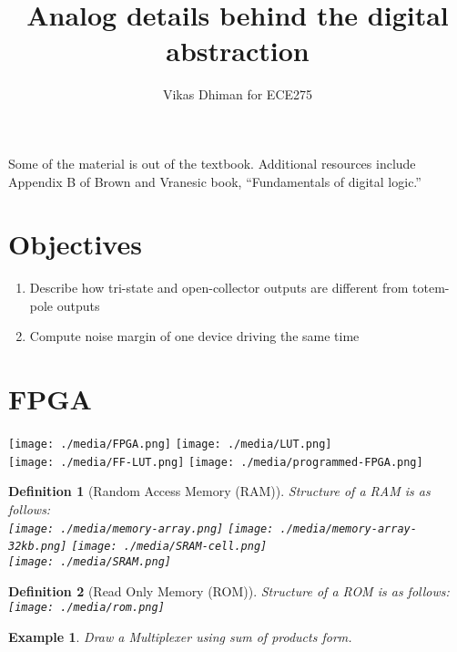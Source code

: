 \documentclass{article}
\author{Vikas Dhiman for ECE275}
\title{Analog details behind the digital abstraction}
\newtheorem{example}{Example}
\newtheorem{definition}{Definition}
\begin{document}
\maketitle

Some of the material is out of the textbook. Additional resources include
Appendix B of Brown and Vranesic book, ``Fundamentals of digital logic.''

\section{Objectives}
\begin{enumerate}
\item Describe how tri-state and open-collector outputs are different from totem-pole outputs
\item Compute noise margin of one device driving the same time
\end{enumerate}

\section{FPGA~\cite[Section~B.6.5]{stephen2022fundamentals}}
\texttt{[image: ./media/FPGA.png]}
\texttt{[image: ./media/LUT.png]}\\

\texttt{[image: ./media/FF-LUT.png]}
\texttt{[image: ./media/programmed-FPGA.png]}


\begin{definition}[Random Access Memory (RAM)] Structure of a RAM is as follows:\\
  \texttt{[image: ./media/memory-array.png]}
  \texttt{[image: ./media/memory-array-32kb.png]}
  \texttt{[image: ./media/SRAM-cell.png]}\\
  \texttt{[image: ./media/SRAM.png]}
\end{definition}

\begin{definition}[Read Only Memory (ROM)] Structure of a ROM is as follows:\\
  \texttt{[image: ./media/rom.png]}
\end{definition}

\begin{example}
Draw a Multiplexer using sum of products form.
\end{example}
\vspace{10em}
\end{document}
